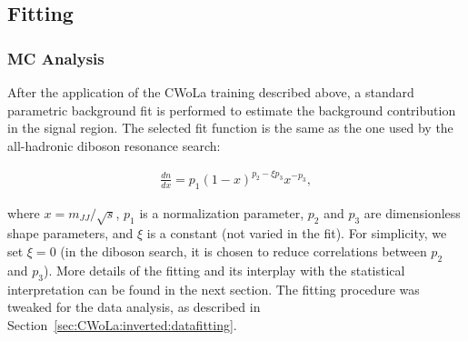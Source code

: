 \subsection{Fitting}
\label{sec:CWoLa:background}

\subsubsection{MC Analysis}
After the application of the CWoLa training described above, a standard parametric background fit is performed to estimate the background contribution in the signal region.  The selected fit function is the same as the one used by the all-hadronic diboson resonance search:

\begin{align}
\label{eqn:CWoLa:fitfunction}
\frac{dn}{dx}=p_1(1-x)^{p_2-\xi p_3}x^{-p_3},
\end{align}

\noindent where $x=m_{JJ}/\sqrt{s}$, $p_1$ is a normalization parameter, $p_2$ and $p_3$ are dimensionless shape parameters, and $\xi$ is a constant (not varied in the fit).  For simplicity, we set $\xi=0$ (in the diboson search, it is chosen to reduce correlations between $p_2$ and $p_3$). More details of the fitting and its interplay with the statistical interpretation can be found in the next section.  The fitting procedure was tweaked for the data analysis, as described in Section~\ref{sec:CWoLa:inverted:datafitting}.


